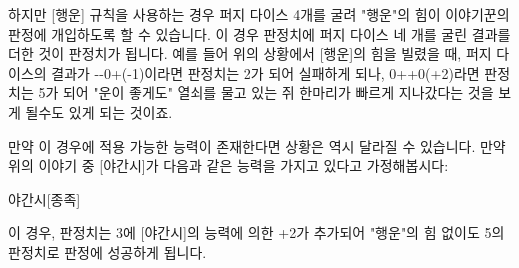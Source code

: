 \documentclass{report}
\begin{document}
	하지만 [행운] 규칙을 사용하는 경우 퍼지 다이스 4개를 굴려 "행운"의 힘이 이야기꾼의 판정에 개입하도록 할 수 있습니다. 이 경우 판정치에 퍼지 다이스 네 개를 굴린 결과를 더한 것이 판정치가 됩니다. 예를 들어 위의 상황에서 [행운]의 힘을 빌렸을 때, 퍼지 다이스의 결과가 -{}-0+(-1)이라면 판정치는 2가 되어 실패하게 되나, 0++0(+2)라면 판정치는 5가 되어 "운이 좋게도" 열쇠를 물고 있는 쥐 한마리가 빠르게 지나갔다는 것을 보게 될수도 있게 되는 것이죠.
	
	만약 이 경우에 적용 가능한 능력이 존재한다면 상황은 역시 달라질 수 있습니다. 만약 위의 이야기 중 [야간시]가 다음과 같은 능력을 가지고 있다고 가정해봅시다:
	\begin{story}{야간시}{[종족]}
	\end{story}
	이 경우, 판정치는 3에 [야간시]의 능력에 의한 +2가 추가되어 "행운"의 힘 없이도 5의 판정치로 판정에 성공하게 됩니다.
	
\end{document}
